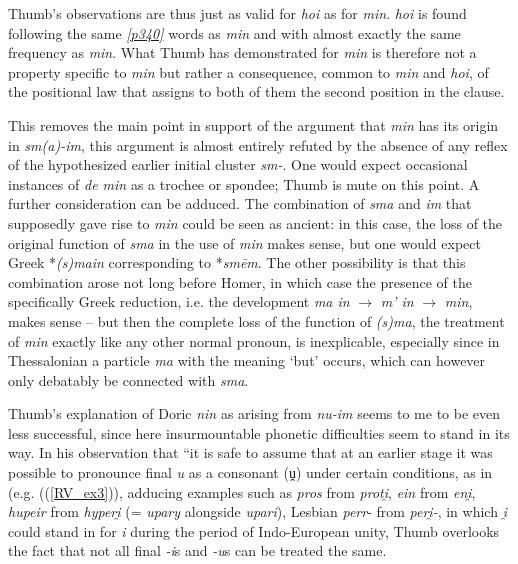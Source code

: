 Thumb's observations are thus just as valid for \emph{hoi} as for \emph{min}. \emph{hoi} is found following the same \hyperlink{p340}{\emph{[p340]}} words as \emph{min} and with almost exactly the same frequency as \emph{min}. What Thumb has demonstrated for \emph{min} is therefore not a property specific to \emph{min} but rather a consequence, common to \emph{min} and \emph{hoi}, of the positional law that assigns to both of them the second position in the clause.

This removes the main point in support of the argument that \emph{min} has its origin in \emph{sm(a)-im}, this argument is almost entirely refuted by the absence of any reflex of the hypothesized earlier initial cluster \emph{sm-}. One would expect occasional instances of \emph{de min} as a trochee or spondee; Thumb is mute on this point. A further consideration can be adduced. The combination of \emph{sma} and \emph{im} that supposedly gave rise to \emph{min} could be seen as ancient: in this case, the loss of the original function of \emph{sma} in the use of \emph{min} makes sense, but one would expect Greek *\emph{(s)main} corresponding to  *\emph{smēm}. The other possibility is that this combination arose not long before Homer, in which case the presence of the specifically Greek reduction, i.e. the development \emph{ma in} $\to$ \emph{m' in} $\to$ \emph{min}, makes sense -- but then the complete loss of the function of \emph{(s)ma}, the treatment of \emph{min} exactly like any other normal pronoun, is inexplicable, especially since in Thessalonian a particle \emph{ma} with the meaning `but' occurs, which can however only debatably be connected with  \emph{sma}.

Thumb's explanation of Doric \emph{nin} as arising from \emph{nu-im} seems to me to be even less successful, since here insurmountable phonetic difficulties seem to stand in its way. In his observation that ``it is safe to assume that at an earlier stage it was possible to pronounce final \emph{u} as a consonant (ṷ) under certain conditions, as in  (e.g. ((\ref{RV_ex3})), adducing examples such as \emph{pros} from \emph{proti̯}, \emph{ein} from \emph{eni̯}, \emph{hupeir} from \emph{hyperi̯} (=  \emph{upary} alongside \emph{upari}), Lesbian \emph{perr}- from \emph{peri̯-}, in which \emph{i̯} could stand in for \emph{i} during the period of Indo-European unity, Thumb overlooks the fact that not all final \emph{-i}s and \emph{-u}s can be treated the same.

